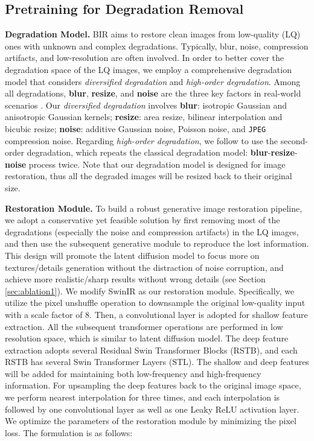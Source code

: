 \documentclass{article}
\begin{document}
\subsection{Pretraining for Degradation Removal}
\label{sec:method1}
\noindent\textbf{Degradation Model.} 
BIR aims to restore clean images from low-quality (LQ) ones with unknown and complex degradations. Typically, blur, noise, compression artifacts, and low-resolution are often involved.
In order to better cover the degradation space of the LQ images, we employ a comprehensive degradation model that considers \textit{diversified degradation} and \textit{high-order degradation}.
Among all degradations, \textbf{blur}, \textbf{resize}, and \textbf{noise} are the three key factors in real-world scenarios \cite{bsrgan}. Our \textit{diversified degradation} involves \textbf{blur}: isotropic Gaussian and anisotropic Gaussian kernels; \textbf{resize}: area resize, bilinear interpolation and bicubic resize; \textbf{noise}: additive Gaussian noise, Poisson noise, and \texttt{JPEG} compression noise. Regarding \textit{high-order degradation}, we follow \cite{realesrgan} to use the second-order degradation, which repeats the classical degradation model: \textbf{blur}-\textbf{resize}-\textbf{noise} process twice.
Note that our degradation model is designed for image restoration, thus all the degraded images will be resized back to their original size.




\noindent\textbf{Restoration Module.} 
To build a robust generative image restoration pipeline, we adopt a conservative yet feasible solution by first removing most of the degradations (especially the noise and compression artifacts) in the LQ images, 
and then use the subsequent generative module to reproduce the lost information. 
This design will promote the latent diffusion model to focus more on textures/details generation without the distraction of noise corruption, and achieve more realistic/sharp results without wrong details (see Section \ref{sec:ablation1}). 
We modify SwinIR \cite{swinir} as our restoration module. Specifically, we utilize the pixel unshuffle \cite{pixelshuffle} operation to downsample the original low-quality input  with a scale factor of 8. Then, a  convolutional layer is adopted for shallow feature extraction. All the subsequent transformer operations are performed in low resolution space, which is similar to latent diffusion model. The deep feature extraction adopts several Residual Swin Transformer Blocks (RSTB), and each RSTB has several Swin Transformer Layers (STL). The shallow and deep features will be added for maintaining both low-frequency and high-frequency information. For upsampling the deep features back to the original image space, we perform nearest interpolation for three times, and each interpolation is followed by one convolutional layer as well as one Leaky ReLU activation layer. 
We optimize the parameters of the restoration module by minimizing the  pixel loss. The formulation is as follows: 
\end{document}
